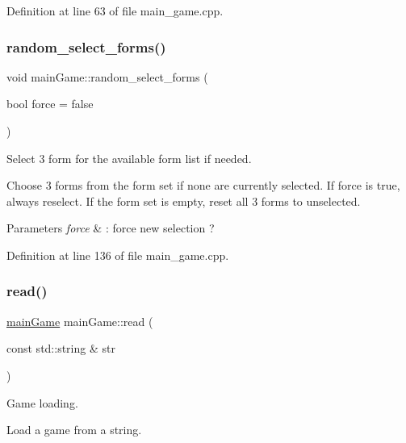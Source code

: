 Definition at line 63 of file main\+\_\+game.\+cpp.

\hypertarget{classmain_game_a9d796e10ca081ec5a25b4eecfd97d1de}{}\label{classmain_game_a9d796e10ca081ec5a25b4eecfd97d1de} 
\subsubsection{\texorpdfstring{random\+\_\+select\+\_\+forms()}{random\_select\_forms()}}
{\footnotesize\ttfamily void main\+Game\+::random\+\_\+select\+\_\+forms (\begin{DoxyParamCaption}\item[{bool}]{force = {\ttfamily false} }\end{DoxyParamCaption})}



Select 3 form for the available form list if needed. 

Choose 3 forms from the form set if none are currently selected. If force is true, always reselect. If the form set is empty, reset all 3 forms to unselected.


\begin{DoxyParams}{Parameters}
{\em force} & \+: force new selection ? \\
\hline
\end{DoxyParams}


Definition at line 136 of file main\+\_\+game.\+cpp.

\hypertarget{classmain_game_a51f19bcf307187637dffb26e58e1fc4c}{}\label{classmain_game_a51f19bcf307187637dffb26e58e1fc4c} 
\subsubsection{\texorpdfstring{read()}{read()}}
{\footnotesize\ttfamily \hyperlink{classmain_game}{main\+Game} main\+Game\+::read (\begin{DoxyParamCaption}\item[{const std\+::string \&}]{str }\end{DoxyParamCaption})\hspace{0.3cm}{\ttfamily [static]}}



Game loading. 

Load a game from a string.


